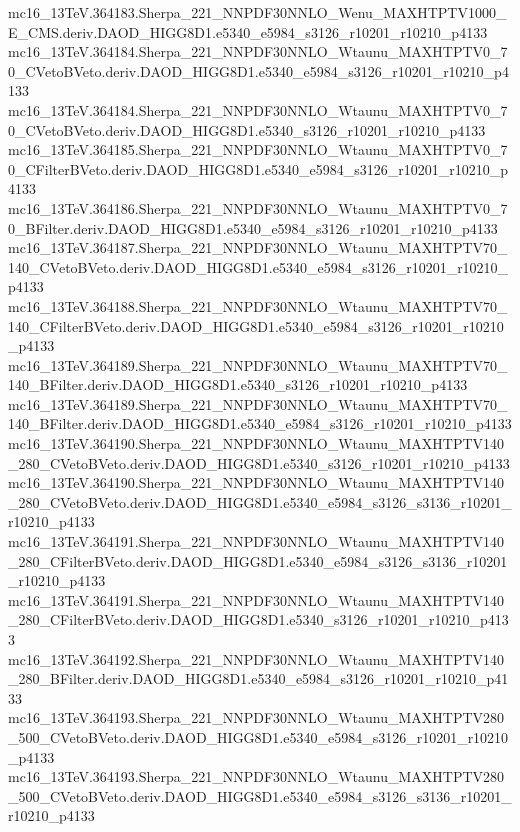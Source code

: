 mc16_13TeV.364183.Sherpa_221_NNPDF30NNLO_Wenu_MAXHTPTV1000_E_CMS.deriv.DAOD_HIGG8D1.e5340_e5984_s3126_r10201_r10210_p4133 \\
mc16_13TeV.364184.Sherpa_221_NNPDF30NNLO_Wtaunu_MAXHTPTV0_70_CVetoBVeto.deriv.DAOD_HIGG8D1.e5340_e5984_s3126_r10201_r10210_p4133 \\
mc16_13TeV.364184.Sherpa_221_NNPDF30NNLO_Wtaunu_MAXHTPTV0_70_CVetoBVeto.deriv.DAOD_HIGG8D1.e5340_s3126_r10201_r10210_p4133 \\
mc16_13TeV.364185.Sherpa_221_NNPDF30NNLO_Wtaunu_MAXHTPTV0_70_CFilterBVeto.deriv.DAOD_HIGG8D1.e5340_e5984_s3126_r10201_r10210_p4133 \\
mc16_13TeV.364186.Sherpa_221_NNPDF30NNLO_Wtaunu_MAXHTPTV0_70_BFilter.deriv.DAOD_HIGG8D1.e5340_e5984_s3126_r10201_r10210_p4133 \\
mc16_13TeV.364187.Sherpa_221_NNPDF30NNLO_Wtaunu_MAXHTPTV70_140_CVetoBVeto.deriv.DAOD_HIGG8D1.e5340_e5984_s3126_r10201_r10210_p4133 \\
mc16_13TeV.364188.Sherpa_221_NNPDF30NNLO_Wtaunu_MAXHTPTV70_140_CFilterBVeto.deriv.DAOD_HIGG8D1.e5340_e5984_s3126_r10201_r10210_p4133 \\
mc16_13TeV.364189.Sherpa_221_NNPDF30NNLO_Wtaunu_MAXHTPTV70_140_BFilter.deriv.DAOD_HIGG8D1.e5340_s3126_r10201_r10210_p4133 \\
mc16_13TeV.364189.Sherpa_221_NNPDF30NNLO_Wtaunu_MAXHTPTV70_140_BFilter.deriv.DAOD_HIGG8D1.e5340_e5984_s3126_r10201_r10210_p4133 \\
mc16_13TeV.364190.Sherpa_221_NNPDF30NNLO_Wtaunu_MAXHTPTV140_280_CVetoBVeto.deriv.DAOD_HIGG8D1.e5340_s3126_r10201_r10210_p4133 \\
mc16_13TeV.364190.Sherpa_221_NNPDF30NNLO_Wtaunu_MAXHTPTV140_280_CVetoBVeto.deriv.DAOD_HIGG8D1.e5340_e5984_s3126_s3136_r10201_r10210_p4133 \\
mc16_13TeV.364191.Sherpa_221_NNPDF30NNLO_Wtaunu_MAXHTPTV140_280_CFilterBVeto.deriv.DAOD_HIGG8D1.e5340_e5984_s3126_s3136_r10201_r10210_p4133 \\
mc16_13TeV.364191.Sherpa_221_NNPDF30NNLO_Wtaunu_MAXHTPTV140_280_CFilterBVeto.deriv.DAOD_HIGG8D1.e5340_s3126_r10201_r10210_p4133 \\
mc16_13TeV.364192.Sherpa_221_NNPDF30NNLO_Wtaunu_MAXHTPTV140_280_BFilter.deriv.DAOD_HIGG8D1.e5340_e5984_s3126_r10201_r10210_p4133 \\
mc16_13TeV.364193.Sherpa_221_NNPDF30NNLO_Wtaunu_MAXHTPTV280_500_CVetoBVeto.deriv.DAOD_HIGG8D1.e5340_e5984_s3126_r10201_r10210_p4133 \\
mc16_13TeV.364193.Sherpa_221_NNPDF30NNLO_Wtaunu_MAXHTPTV280_500_CVetoBVeto.deriv.DAOD_HIGG8D1.e5340_e5984_s3126_s3136_r10201_r10210_p4133 \\
